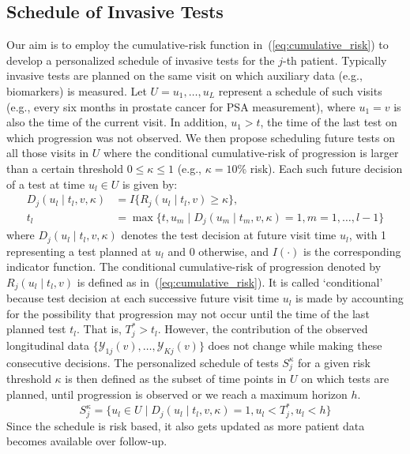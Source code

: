 \subsection{Schedule of Invasive Tests}
\label{subsec:pers_schedule}
Our aim is to employ the cumulative-risk function in~(\ref{eq:cumulative_risk}) to develop a personalized schedule of invasive tests for the $j$-th patient. Typically invasive tests are planned on the same visit on which auxiliary data (e.g., biomarkers) is measured. Let $U={u_1, \ldots, u_L}$ represent a schedule of such visits (e.g., every six months in prostate cancer for PSA measurement), where $u_1=v$ is also the time of the current visit. In addition, $u_1 > t$, the time of the last test on which progression was not observed. We then propose scheduling future tests on all those visits in $U$ where the conditional cumulative-risk of progression is larger than a certain threshold $0 \leq \kappa \leq 1$ (e.g., $\kappa=10$\% risk). Each such future decision of a test at time $u_l \in U$ is given by:
\begin{equation*}
\label{eq:personalized_decision_grid}
\begin{split}
D_j(u_l \mid t_l, v, \kappa) &= I\big\{R_j(u_l \mid t_l, v) \geq \kappa \big\},\\
t_{l} &= \max \big\{t, u_m \mid D_j(u_m \mid t_m, v, \kappa)=1, m=1,\ldots,l-1 \big\}
\end{split}
\end{equation*}
where $D_j(u_l \mid t_l, v, \kappa)$ denotes the test decision at future visit time $u_l$, with 1 representing a test planned at $u_l$ and 0 otherwise, and $I(\cdot)$ is the corresponding indicator function. The conditional cumulative-risk of progression denoted by $R_j(u_l \mid t_l, v)$ is defined as in~(\ref{eq:cumulative_risk}). It is called `conditional' because test decision at each successive future visit time $u_l$ is made by accounting for the possibility that progression may not occur until the time of the last planned test $t_l$. That is, $T^*_j > t_l$. However, the contribution of the observed longitudinal data $\{\mathcal{Y}_{1j}(v), \ldots, \mathcal{Y}_{Kj}(v)\}$ does not change while making these consecutive decisions. The personalized schedule of tests $S_j^\kappa$ for a given risk threshold $\kappa$ is then defined as the subset of time points in $U$ on which tests are planned, until progression is observed or we reach a maximum horizon $h$.
\begin{equation*}
\label{eq:personalized_schedule_grid}
S_j^\kappa = \Big\{ u_l \in U \mid D_j(u_l \mid t_l, v, \kappa)=1, u_l < T^*_j, u_l<h \Big\}
\end{equation*}
Since the schedule is risk based, it also gets updated as more patient data becomes available over follow-up.

